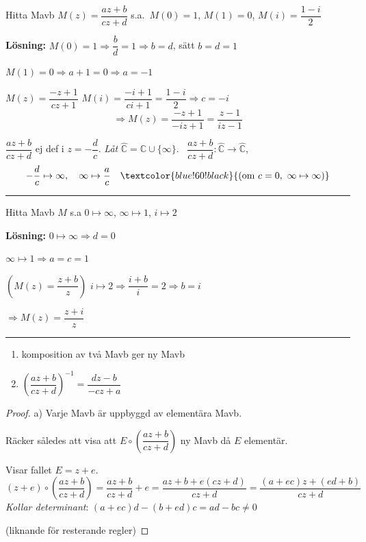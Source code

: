 \begin{example}
Hitta Mavb $M(z) = \dfrac{az + b}{cz + d}$ s.a.\ $M(0) = 1$, $M(1) = 0$, $M(i) = \dfrac{1 - i}{2}$

\textbf{Lösning:} $M(0) = 1 \Rightarrow \dfrac{b}{d} = 1 \Rightarrow b = d$, sätt $b = d = 1$

$M(1) = 0 \Rightarrow a + 1 = 0 \Rightarrow a = -1$

$M(z) = \dfrac{-z + 1}{cz + 1}$ \qquad $M(i) = \dfrac{-i + 1}{ci + 1} = \dfrac{1 - i}{2} \Rightarrow c = -i$
\[ \Rightarrow M(z) = \frac{-z + 1}{-iz + 1} = \frac{z - 1}{iz - 1} \]
\end{example}

\begin{note}
$\dfrac{az + b}{cz + d}$ ej def i $z = -\dfrac{d}{c}$. \emph{Låt} $\hat{\mathbb{C}} = \mathbb{C} \cup \{\infty\}$. \ $\dfrac{az + b}{cz + d} : \hat{\mathbb{C}} \to \hat{\mathbb{C}}$,
\[ -\frac{d}{c} \mapsto \infty, \quad \infty \mapsto \frac{a}{c} \quad \textcolor{blue!60!black}{(\text{om } c = 0,\ \infty \mapsto \infty)} \]
\end{note}

\noindent\rule{\linewidth}{0.4pt}

\begin{example}
Hitta Mavb $M$ s.a $0 \mapsto \infty$, $\infty \mapsto 1$, $i \mapsto 2$

\textbf{Lösning:} $0 \mapsto \infty \Rightarrow d = 0$

$\infty \mapsto 1 \Rightarrow a = c = 1$

$\left(M(z) = \dfrac{z + b}{z}\right)$ \quad $i \mapsto 2 \Rightarrow \dfrac{i + b}{i} = 2 \Rightarrow b = i$

$\Rightarrow M(z) = \dfrac{z + i}{z}$
\end{example}

\noindent\rule{\linewidth}{0.4pt}

\begin{theorem}[Proposition 3.1]
\begin{enumerate}[label=\alph*)]
  \item komposition av två Mavb ger ny Mavb
  \item $\left(\dfrac{az + b}{cz + d}\right)^{-1} = \dfrac{dz - b}{-cz + a}$
\end{enumerate}
\end{theorem}
\begin{proof}
a) Varje Mavb är uppbyggd av elementära Mavb.

Räcker således att visa att $E \circ \left(\dfrac{az + b}{cz + d}\right)$ ny Mavb då $E$ elementär.

Visar fallet $E = z + e$.
\[ (z + e) \circ \left(\frac{az + b}{cz + d}\right) = \frac{az + b}{cz + d} + e = \frac{az + b + e(cz + d)}{cz + d} = \frac{(a + ec)z + (ed + b)}{cz + d} \]
\emph{Kollar determinant}: $(a + ec)d - (b + ed)c = ad - bc \neq 0$

\textcolor{magenta!80!black}{(liknande för resterande regler)}
\end{proof}
